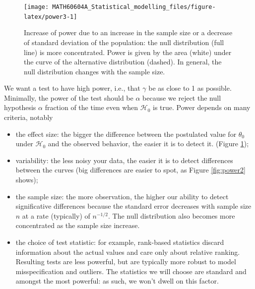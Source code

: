 \documentclass[
  11pt,
  letterpaper,
]{book}
\providecommand{\tightlist}{%
  \setlength{\itemsep}{0pt}\setlength{\parskip}{0pt}}
\theoremstyle{definition}
\theoremstyle{definition}
\theoremstyle{definition}
\theoremstyle{remark}
\begin{document}
\begin{figure}

{\centering \texttt{[image: MATH60604A\_Statistical\_modelling\_files/figure-latex/power3-1]} 

}

\caption{Increase of power due to an increase in the sample size or a decrease of standard deviation of the population: the null distribution (full line) is more concentrated. Power is given by the area (white) under the curve of the alternative distribution (dashed). In general, the null distribution changes with the sample size.}\label{fig:power3}
\end{figure}

We want a test to have high power, i.e., that \(\gamma\) be as close to 1 as possible. Minimally, the power of the test should be \(\alpha\) because we reject the null hypothesis \(\alpha\) fraction of the time even when \(\mathscr{H}_0\) is true. Power depends on many criteria, notably

\begin{itemize}
\tightlist
\item
  the effect size: the bigger the difference between the postulated value for \(\theta_0\) under \(\mathscr{H}_0\) and the observed behavior, the easier it is to detect it.
  (Figure \ref{fig:power3});
\item
  variability: the less noisy your data, the easier it is to detect differences between the curves (big differences are easier to spot, as Figure \ref{fig:power2} shows);
\item
  the sample size: the more observation, the higher our ability to detect significative differences because the standard error decreases with sample size \(n\) at a rate (typically) of \(n^{-1/2}\). The null distribution also becomes more concentrated as the sample size increase.
\item
  the choice of test statistic: for example, rank-based statistics discard information about the actual values and care only about relative ranking. Resulting tests are less powerful, but are typically more robust to model misspecification and outliers. The statistics we will choose are standard and amongst the most powerful: as such, we won't dwell on this factor.
\end{itemize}
\end{document}
